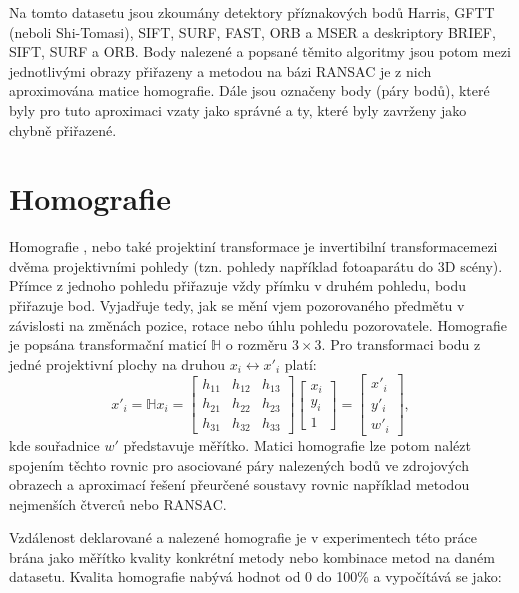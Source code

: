 Na tomto datasetu jsou zkoumány detektory příznakových bodů Harris, GFTT (neboli Shi-Tomasi), SIFT, SURF, FAST, ORB a MSER a deskriptory BRIEF, SIFT, SURF a ORB. Body nalezené a popsané těmito algoritmy jsou potom mezi jednotlivými obrazy přiřazeny a metodou na bázi RANSAC je z nich aproximována matice homografie. Dále jsou označeny body (páry bodů), které byly pro tuto aproximaci vzaty jako správné a ty,  které byly zavrženy jako chybně přiřazené.

\section{Homografie}
\label{sec:homo}

Homografie \cite{berenda2010homografie}, nebo také projektiní transformace je invertibilní transformacemezi dvěma projektivními pohledy (tzn. pohledy například fotoaparátu do 3D scény). Přímce z jednoho pohledu přiřazuje vždy přímku v druhém pohledu, bodu přiřazuje bod. Vyjadřuje tedy, jak se mění vjem pozorovaného předmětu v závislosti na změnách pozice, rotace nebo úhlu pohledu pozorovatele. Homografie je popsána transformační maticí $\mathbb{H}$ o rozměru $3\times 3$. Pro transformaci bodu z jedné projektivní plochy na druhou $x_i \leftrightarrow x'_i$ platí:
\begin{equation}
x'_i = \mathbb{H}x_i = 
\begin{bmatrix}
h_{11} & h_{12} & h_{13} \\
h_{21} & h_{22} & h_{23} \\
h_{31} & h_{32} & h_{33}
\end{bmatrix}
\begin{bmatrix}
x_i \\ y_i \\ 1
\end{bmatrix}
= 
\begin{bmatrix}
x'_i \\ y'_i \\ w'_i
\end{bmatrix},
\end{equation} 
kde souřadnice $w'$ představuje měřítko. Matici homografie lze potom nalézt spojením těchto rovnic pro asociované páry nalezených bodů ve zdrojových obrazech a aproximací řešení přeurčené soustavy rovnic například metodou nejmenších čtverců nebo RANSAC. 

Vzdálenost deklarované a nalezené homografie je v experimentech této práce brána jako měřítko kvality konkrétní metody nebo kombinace metod na daném datasetu. Kvalita homografie nabývá hodnot od 0 do 100\% a vypočítává se jako:

